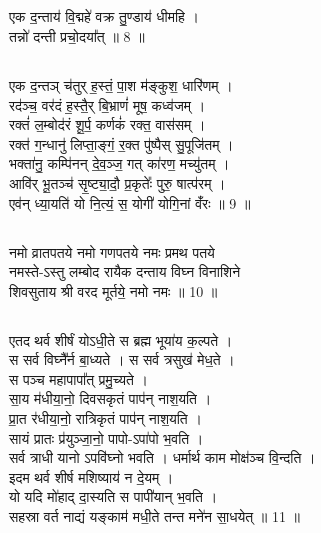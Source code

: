 \subsection{}
एक द॒न्ताय॑ वि॒द्महे॑ वक्र तु॒ण्डाय॑ धीमहि ।\\
तन्नो॑ दन्ती प्रचो॒दया᳚त् ॥ 8 ॥\\
\subsection{}
एक द॒न्तञ् च॑तुर् ह॒स्तं॒ पा॒श म॑ङ्कुश॒ धारि॑णम् ।\\
रद॑ञ्च॒ वर॑दं ह॒स्तै॒र् बि॒भ्राणं॑ मूष॒ कध्व॑जम् ।\\
रक्तं॑ ल॒म्बोद॑रं शू॒र्प॒ कर्णकं॑ रक्त॒ वास॑सम् ।\\
रक्त॑ ग॒न्धानु॑ लिप्ता॒ङ्गं॒ र॒क्त पु॑ष्पैस् सु॒पूजि॑तम् ।\\
भक्ता॑नु॒ कम्पि॑नन् दे॒व॒ञ्ज॒ गत् का॑रण॒ मच्यु॑तम् ।\\
आवि॑र् भू॒तञ्च॑ सृ॒ष्ट्या॒दौ॒ प्र॒कृतेः᳚ पुरु॒ षात्प॑रम् ।\\
एव॑न् ध्या॒यति॑ यो नि॒त्यं॒ स॒ योगी॑ योगि॒नां वँ॑रः ॥ 9 ॥\\
\subsection{}
नमो व्रातपतये नमो गणपतये नमः प्रमथ पतये \\
नमस्ते-ऽस्तु लम्बोद रायैक दन्ताय विघ्न विनाशिने \\
शिवसुताय श्री वरद मूर्तये॒ नमो नमः ॥ 10 ॥\\
\subsection{}
एतद थर्व शीर्षं योऽधी॒ते स ब्रह्म भूया॑य क॒ल्पते ।\\
स सर्व विघ्नै᳚र्न बा॒ध्यते । स सर्व त्रसुख॑ मेध॒ते ।\\
स पञ्च महापापा᳚त् प्रमु॒च्यते । \\
सा॒य म॑धीया॒नो॒ दिवसकृतं पाप॑न् नाश॒यति ।\\
प्रा॒त र॑धीया॒नो॒ रात्रिकृतं पाप॑न् नाश॒यति ।\\
सायं प्रातः प्र॑युञ्जा॒नो॒ पापो-ऽपा॑पो भ॒वति ।\\
सर्व त्राधी यानो ऽपवि॑घ्नो भवति । धर्मार्थ काम मोक्ष॑ञ्च वि॒न्दति ।\\
इदम थर्व शीर्ष मशिष्याय॑ न दे॒यम् । \\
यो यदि मो॑हाद् दा॒स्यति स पापी॑यान् भ॒वति ।\\
सहस्रा वर्त नाद्यं यङ्काम॑ मधी॒ते तन्त मने॑न सा॒धयेत् ॥  11 ॥\\
